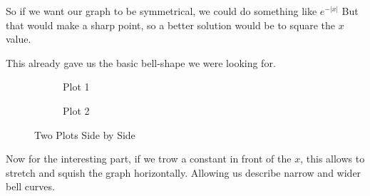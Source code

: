 \documentclass[11pt]{article}
\begin{document}
So if we want our graph to be symmetrical, we could do something like
\(e^{-|x|}\)
But that would make a sharp point, so a better solution would be to
square the \(x\) value.

This already gave us the basic bell-shape we were looking for.

\begin{figure}
  \centering
  \begin{subfigure}[b]{0.45\textwidth}
    \caption{Plot 1}
    \label{fig:plot1}
  \end{subfigure}
  \hfill
  \begin{subfigure}[b]{0.45\textwidth}
    \caption{Plot 2}
    \label{fig:plot2}
  \end{subfigure}
  \caption{Two Plots Side by Side}
  \label{fig:plots}
\end{figure}




Now for the interesting part, if we trow a constant in front of the \(x\), this allows to stretch and
squish the graph horizontally. Allowing us describe narrow and wider
bell curves.  
\end{document}
